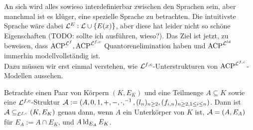     An sich wird alles sowieso interdefinierbar zwischen den Sprachen sein, aber manchmal ist es klüger, eine spezielle Sprache zu betrachten. Die intuitivste Sprache wäre dabei $\mathcal{L}^E:\mathcal{L}\cup\{E(x)\}$, aber diese hat leider nicht so schöne Eigenschaften (TODO: sollte ich ausführen, wieso?). Das Ziel ist jetzt, zu beweisen, dass $\operatorname{ACP}^{\mathcal{L}^f},\operatorname{ACP}^{\mathcal{L}^{f,c}}$ Quantorenelimination haben und $\operatorname{ACP}^{\mathcal{L}^{ld}}$ immerhin modellvollständig ist.\\
    Dazu müssen wir erst einmal verstehen, wie $\mathcal{L}^{f,c}$-Unterstrukturen von $\operatorname{ACP}^{\mathcal{L}^{f,c}}$-Modellen aussehen.
    
    \begin{lemma}
    	Betrachte einen Paar von Körpern $(K,E_K)$ und eine Teilmenge ${A\subseteq K}$ sowie eine $\mathcal{L}^{f,c}$-Struktur $\mathcal{A}:=(A,0,1,+,-,\cdot,^{-1},(l_n)_{n\geq2},(f_{i,n})_{n\geq2,1\leq i\leq n})$. Dann ist $\mathcal{A}\subseteq_{\mathcal{L}^{f,c}}(K,E_K)$ genau dann, wenn $A$ ein Unterkörper von $K$ ist, $\mathcal{A}=(A,E_A)$ für $E_A:=A\cap E_K$, und $A\operatorname{ld}_{E_A}E_K$.
    \end{lemma}
